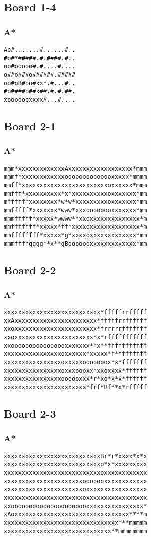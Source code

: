 \documentclass[11pt,a4paper]{article}
\begin{document}
\subsection*{Board 1-4}
\subsubsection*{A*}
\begin{lstlisting}
Ao#.......#......#..
#o#*#####.#.####.#..
oo#ooooo#.#....#....
o##o###o######.#####
oo#oB#oo#xx*.#...#..
#o####o##x##.#.#.##.
xooooooxxxx#...#....
\end{lstlisting}
\subsection*{Board 2-1}
\subsubsection*{A*}
\begin{lstlisting}
mmm*xxxxxxxxxxxxxAxxxxxxxxxxxxxxxxxx*mmm
mmmf*xxxxxxxxxxxxoooooooooooooxxxxx*mmmm
mmff*xxxxxxxxxxxxxxxxxxxxxxxxoxxxxxx*mmm
mmfff*xxxxxxxxxx*x*xxxxxxxxxxoxxxxxxx*mm
mfffff*xxxxxxxx*w*w*xxxxxxxxxoxxxxxxx*mm
mmfffff*xxxxxxx*www*xxxoooooooxxxxxxx*mm
mmmfffff*xxxxx*wwww**xxoxxxxxxxxxxxxxx*m
mmfffffff*xxxxx*ff*xxxxoxxxxxxxxxxxxxx*m
mmffffffff*xxxxx*g*xxxxoxxxxxxxxxxxxx*mm
mmmffffgggg**x**gBooooooxxxxxxxxxxxxx*mm
\end{lstlisting}
\subsection*{Board 2-2}
\subsubsection*{A*}
\begin{lstlisting}
xxxxxxxxxxxxxxxxxxxxxxxxxxx*fffffrrfffff
xxAxxxxxxxxxxxxxxxxxxxxxxx*fffffrrffffff
xxoxxxxxxxxxxxxxxxxxxxxxxx*frrrrrfffffff
xxoxxxxxxxxxxxxxxxxxxxxxx*x*rfffffffffff
xxoooooooooooooooxxxxxxx**x**fffffffffff
xxxxxxxxxxxxxxxxoxxxxxx*xxxxx*f*ffffffff
xxxxxxxxxxxxxxxxoxxxxxooooooox*x*fffffff
xxxxxxxxxxxxxxxxoxxxoooxx*xxoxxxx*ffffff
xxxxxxxxxxxxxxxxoooooxxx*r*xo*x*x*ffffff
xxxxxxxxxxxxxxxxxxxxxxx*frf*Bf**x*rfffff
\end{lstlisting}
\subsection*{Board 2-3}
\subsubsection*{A*}
\begin{lstlisting}
xxxxxxxxxxxxxxxxxxxxxxxxxxxBr*r*xxxx*x*x
xxxxxxxxxxxxxxxxxxxxxxxxxxxo*x*xxxxxxxxx
xxxxxxxxxxxxxxxxxxxxxxxxxxxoxxxxxxxxxxxx
xxxxxxxxxxxxxxxxxxxxxxooooooxxxxxxxxxxxx
xxxxxxxxxxxxxxxxxxxxxxoxxxxxxxxxxxxxxxxx
xxxxxxxxxxxxxxxxxxxxxxoxxxxxxxxxxxxxxxxx
xxoooooooooooooooooooooxxxxxxxxxxxxxxxx*
xAoxxxxxxxxxxxxxxxxxxxxxxxxxxxxxxxx****m
xxxxxxxxxxxxxxxxxxxxxxxxxxxxxxxx***mmmmm
xxxxxxxxxxxxxxxxxxxxxxxxxxxxxx**mmmmmmmm
\end{lstlisting}
\end{document}
